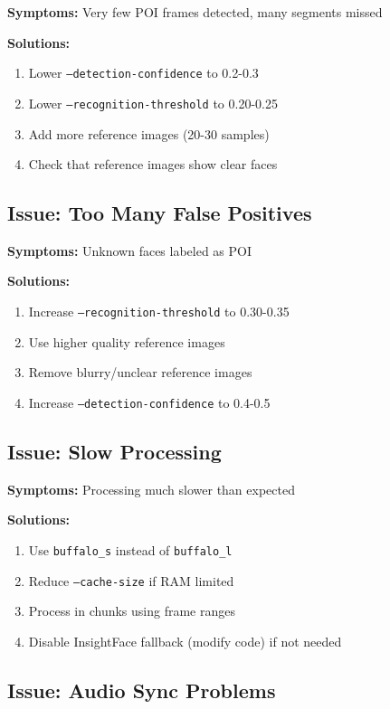 \documentclass[11pt,a4paper]{article}
\begin{document}
\textbf{Symptoms:} Very few POI frames detected, many segments missed

\textbf{Solutions:}
\begin{enumerate}
    \item Lower \texttt{--detection-confidence} to 0.2-0.3
    \item Lower \texttt{--recognition-threshold} to 0.20-0.25
    \item Add more reference images (20-30 samples)
    \item Check that reference images show clear faces
\end{enumerate}

\subsection{Issue: Too Many False Positives}

\textbf{Symptoms:} Unknown faces labeled as POI

\textbf{Solutions:}
\begin{enumerate}
    \item Increase \texttt{--recognition-threshold} to 0.30-0.35
    \item Use higher quality reference images
    \item Remove blurry/unclear reference images
    \item Increase \texttt{--detection-confidence} to 0.4-0.5
\end{enumerate}

\subsection{Issue: Slow Processing}

\textbf{Symptoms:} Processing much slower than expected

\textbf{Solutions:}
\begin{enumerate}
    \item Use \texttt{buffalo\_s} instead of \texttt{buffalo\_l}
    \item Reduce \texttt{--cache-size} if RAM limited
    \item Process in chunks using frame ranges
    \item Disable InsightFace fallback (modify code) if not needed
\end{enumerate}

\subsection{Issue: Audio Sync Problems}
\end{document}
